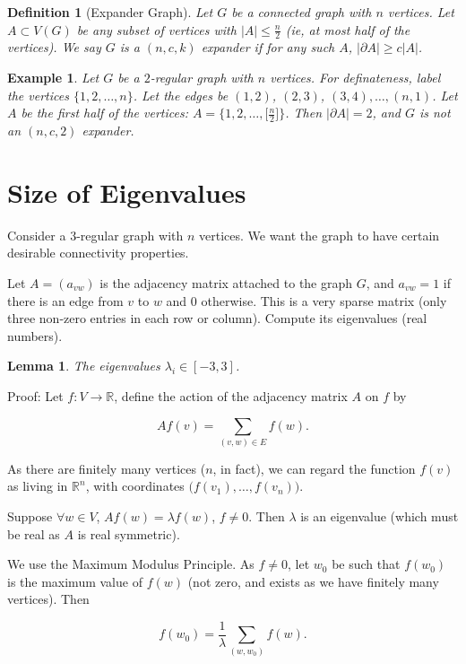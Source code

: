 \documentclass[12pt,letterpaper]{report}
\newcommand\be{\begin{equation}}
\newcommand\ee{\end{equation}}
\newcommand{\R}{\ensuremath{\mathbb{R}}}
\newtheorem{lem}[thm]{Lemma}
\newtheorem{exa}[thm]{Example}
\newtheorem{defi}[thm]{Definition}
\begin{document}
\begin{defi}[Expander Graph] Let $G$ be a connected graph
with $n$ vertices. Let $A \subset V(G)$ be any subset of vertices
with $|A| \le \frac{n}{2}$ (ie, at most half of the vertices). We
say $G$ is a $(n,c,k)$ expander if for any such $A$, $|\partial A|
\ge c|A|$.
\end{defi}

\begin{exa} Let $G$ be a $2$-regular graph with $n$ vertices. For
definateness, label the vertices $\{1,2,\dots,n\}$. Let the edges
be $(1,2)$, $(2,3)$, $(3,4), \dots, (n,1)$. Let $A$ be the first
half of the vertices: $A = \{1, 2, \dots,
\Big[\frac{n}{2}\Big]\}$. Then $|\partial A| = 2$, and $G$ is not
an $(n,c,2)$ expander.
\end{exa}


\section{Size of Eigenvalues}

Consider a $3$-regular graph with $n$ vertices. We want the graph
to have certain desirable connectivity properties.

Let $A = (a_{vw})$ is the adjacency matrix attached to the graph
$G$, and $a_{vw} = 1$ if there is an edge from $v$ to $w$ and $0$
otherwise. This is a very sparse matrix (only three non-zero
entries in each row or column). Compute its eigenvalues (real
numbers).

\begin{lem} The eigenvalues $\lambda_i \in [-3,3]$. \end{lem}

Proof: Let $f: V \rightarrow \R$, define the action of the
adjacency matrix $A$ on $f$ by

\be Af(v) = \sum_{ (v,w) \in E } f(w). \ee

As there are finitely many vertices ($n$, in fact), we can regard
the function $f(v)$ as living in $\R^n$, with coordinates
$\Big(f(v_1), \dots, f(v_n)\Big)$.

Suppose $\forall w \in V$, $Af(w) = \lambda f(w)$, $f \neq 0$.
Then $\lambda$ is an eigenvalue (which must be real as $A$ is real
symmetric).

We use the Maximum Modulus Principle. As $f \neq 0$, let $w_0$ be
such that $f(w_0)$ is the maximum value of $f(w)$ (not zero, and
exists as we have finitely many vertices). Then

\be f(w_0) = \frac{1}{\lambda} \sum_{ (w,w_0) } f(w). \ee
\end{document}
